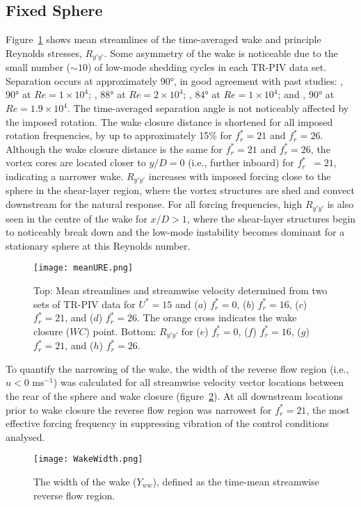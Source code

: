 \documentclass[3p]{elsarticle}
\newcommand{\Ustar}{\ensuremath{U^{*}}}
\newcommand{\freqrat}{\ensuremath{f_r^*}}
\begin{document}
\subsection{Fixed Sphere} \label{sec:fixed} 
Figure~\ref{fig:meanUvel} shows mean streamlines of the time-averaged wake
and principle Reynolds stresses, $R_{y'y'}$. Some asymmetry of the
wake is noticeable due to the small number ($\sim10$) of low-mode
shedding cycles in each TR-PIV data set. Separation occurs at
approximately \ang{90}, in good agreement with past studies: \citet{Yun2006},
\ang{90} at $Re=1\times10^4$; \citet{Tomboulides1993}, \ang{88} at
$Re=2\times10^4$; \citet{Constantinescu2003}, \ang{84} at
$Re=1\times10^4$; and \citet{Grandemange2014}, \ang{90} at
$Re=1.9\times10^4$. The time-averaged separation angle is not noticeably affected by
the imposed rotation. The wake closure distance is shortened for all
imposed rotation frequencies, by up to approximately 15\% for
$\freqrat=21$ and $\freqrat=26$. Although the wake closure distance
is the same for $\freqrat=21$ and $\freqrat=26$, the vortex cores
are located closer to $y/D=0$ (i.e., further inboard) for
\freqrat~$=21$, indicating a narrower wake. $R_{y'y'}$ increases with
imposed forcing close to the sphere in the shear-layer region, where
the vortex structures are shed and convect downstream for the natural response.
For all forcing frequencies, high $R_{y'y'}$ is also seen in the
centre of the wake for $x/D>1$, where the shear-layer structures begin
to noticeably break down and the low-mode instability becomes dominant
for a stationary sphere at this Reynolds number.
%
\begin{figure}
	\centering
	\texttt{[image: meanURE.png]} %
	\caption{Top: Mean streamlines and streamwise velocity
		determined from two sets of TR-PIV data for $\Ustar=15$ and ($a$)
		$\freqrat=0$, ($b$) $\freqrat=16$, ($c$) $\freqrat=21$,
		and ($d$) $\freqrat=26$. The orange cross indicates the
		wake closure ($WC$) point.
		Bottom: $R_{y'y'}$ for ($e$) $\freqrat=0$, ($f$)
		$\freqrat=16$, ($g$) $\freqrat=21$, and ($h$)
		$\freqrat=26$.}
	\label{fig:meanUvel}
\end{figure}
%

To quantify the narrowing of the wake, the width of the reverse flow region (i.e., $u<0$ ms$^{-1}$) was calculated for all streamwise velocity vector locations between the rear of the sphere and wake closure (figure~\ref{fig:width}). At all downstream locations prior to wake closure the reverse flow region was narrowest for $\freqrat=21$, the most effective forcing frequency in suppressing vibration of the control conditions analysed. 
%
\begin{figure}
	\centering
	\texttt{[image: WakeWidth.png]}
	\caption{The width of the wake ($Y_{ww}$), defined as the time-mean streamwise reverse flow region.}
	\label{fig:width}
\end{figure} 
 
\end{document}
